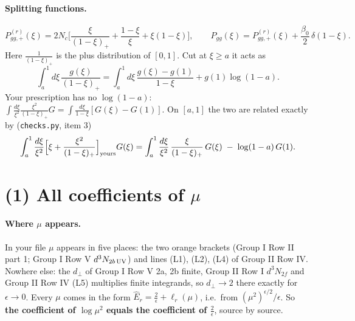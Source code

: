 \documentclass[10pt]{article}
\numberwithin{equation}{section}
\begin{document}
\paragraph{Splitting functions.}
\begin{equation}
P^{(r)}_{gg,+}(\xi)=2N_c\Big[\frac{\xi}{(1-\xi)_+}+\frac{1-\xi}{\xi}+\xi(1-\xi)\Big],\qquad P_{gg}(\xi)=P^{(r)}_{gg,+}(\xi)+\frac{\beta_0}{2}\,\delta(1-\xi).
\end{equation}
Here $\frac{1}{(1-\xi)_+}$ is the plus distribution of $[0,1]$. Cut at $\xi\ge a$ it acts as
\begin{equation}
\int_a^1d\xi\,\frac{g(\xi)}{(1-\xi)_+}=\int_a^1d\xi\,\frac{g(\xi)-g(1)}{1-\xi}+g(1)\log(1-a).\label{eq:plusstd}
\end{equation}
Your prescription has no $\log(1-a)$: $\int\frac{d\xi}{\xi^2}\frac{\xi^2}{(1-\xi)_+}G=\int\frac{d\xi}{1-\xi}[G(\xi)-G(1)]$. On $[a,1]$ the two are related exactly by (\texttt{checks.py}, item 3)
\begin{equation}
\int_a^1\frac{d\xi}{\xi^2}\Big[\xi+\frac{\xi^2}{(1-\xi)_+}\Big]_{\rm yours}G(\xi)=\int_a^1\frac{d\xi}{\xi^2}\,\frac{\xi}{(1-\xi)_+}\,G(\xi)\;-\;\log(1-a)\,G(1).\label{eq:plusrel}
\end{equation}

\section{(1) All coefficients of $\mu$}\label{sec:mu}
\paragraph{Where $\mu$ appears.} In your file $\mu$ appears in five places: the two orange brackets (Group I Row II part 1; Group I Row V $d^3N_{2b\,\rm UV}$) and lines (L1), (L2), (L4) of Group II Row IV. Nowhere else: the $d_\perp$ of Group I Row V 2a, 2b finite, Group II Row I $d^3N_{2f}$ and Group II Row IV (L5) multiplies finite integrands, so $d_\perp\to2$ there exactly for $\epsilon\to0$. Every $\mu$ comes in the form $\hat E_r=\frac2\epsilon+\ell_r(\mu)$, i.e.\ from $(\mu^2)^{\epsilon/2}/\epsilon$. So \textbf{the coefficient of $\log\mu^2$ equals the coefficient of $\frac{2}{\epsilon}$}, source by source.
\end{document}
